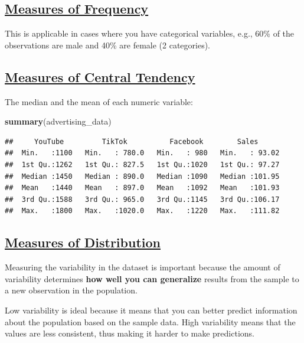 \documentclass[
]{article}
\newenvironment{Shaded}{\begin{snugshade}}{\end{snugshade}}
\newcommand{\FunctionTok}[1]{\textcolor[rgb]{0.13,0.29,0.53}{\textbf{#1}}}
\newcommand{\NormalTok}[1]{#1}
\begin{document}
\subsection{\texorpdfstring{\ul{\textbf{Measures of
Frequency}}}{Measures of Frequency}}\label{measures-of-frequency}

This is applicable in cases where you have categorical variables, e.g.,
60\% of the observations are male and 40\% are female (2 categories).

\subsection{\texorpdfstring{\ul{\textbf{Measures of Central
Tendency}}}{Measures of Central Tendency}}\label{measures-of-central-tendency}

The median and the mean of each numeric variable:

\begin{Shaded}
\begin{Highlighting}[]
\FunctionTok{summary}\NormalTok{(advertising\_data)}
\end{Highlighting}
\end{Shaded}

\begin{verbatim}
##     YouTube         TikTok          Facebook        Sales       
##  Min.   :1100   Min.   : 780.0   Min.   : 980   Min.   : 93.02  
##  1st Qu.:1262   1st Qu.: 827.5   1st Qu.:1020   1st Qu.: 97.27  
##  Median :1450   Median : 890.0   Median :1090   Median :101.95  
##  Mean   :1440   Mean   : 897.0   Mean   :1092   Mean   :101.93  
##  3rd Qu.:1588   3rd Qu.: 965.0   3rd Qu.:1145   3rd Qu.:106.17  
##  Max.   :1800   Max.   :1020.0   Max.   :1220   Max.   :111.82
\end{verbatim}

\subsection{\texorpdfstring{\ul{\textbf{Measures of
Distribution}}}{Measures of Distribution}}\label{measures-of-distribution}

Measuring the variability in the dataset is important because the amount
of variability determines \textbf{how well you can generalize} results
from the sample to a new observation in the population.

Low variability is ideal because it means that you can better predict
information about the population based on the sample data. High
variability means that the values are less consistent, thus making it
harder to make predictions.
\end{document}
